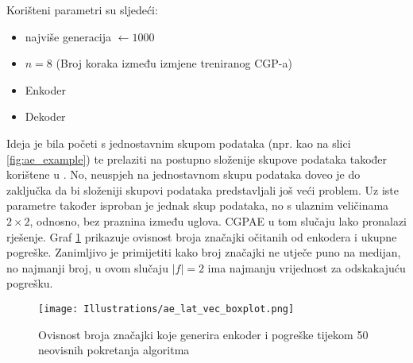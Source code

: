 Korišteni parametri su sljedeći:
\begin{itemize}
	\item {najviše generacija $\leftarrow 1000$}
	\item {$n = 8$ (Broj koraka između izmjene treniranog CGP-a)}
	\item {Enkoder}
	\item {Dekoder}
\end{itemize}
Ideja je bila početi s jednostavnim skupom podataka (npr. kao na slici \ref{fig:ae_example}) te prelaziti na postupno složenije skupove podataka također korištene u \cite{why_ae_diff}.
No, neuspjeh na jednostavnom skupu podataka doveo je do zaključka da bi složeniji skupovi podataka predstavljali još veći problem.
Uz iste parametre također isproban je jednak skup podataka, no s ulaznim veličinama $2 \times 2$, odnosno, bez praznina između uglova.
CGPAE u tom slučaju lako pronalazi rješenje.
Graf \ref{fig:ae_boxplot} prikazuje ovisnost broja značajki očitanih od enkodera i ukupne pogreške.
Zanimljivo je primijetiti kako broj značajki ne utječe puno na medijan, no najmanji broj, u ovom slučaju $|f| = 2$ ima najmanju vrijednost za odskakajuću pogrešku.

\begin{figure}[H]
	\centering
	\texttt{[image: Illustrations/ae\_lat\_vec\_boxplot.png]}
	\caption{Ovisnost broja značajki koje generira enkoder i pogreške tijekom 50 neovisnih pokretanja algoritma}
	\label{fig:ae_boxplot}
\end{figure}
